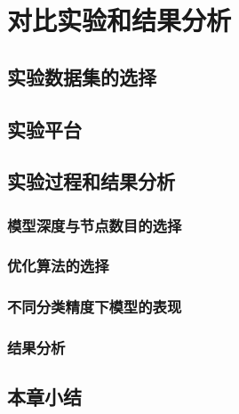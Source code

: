 
\chapter{对比实验和结果分析}

\section{实验数据集的选择}

\section{实验平台}

\section{实验过程和结果分析}

\subsection{模型深度与节点数目的选择}

\subsection{优化算法的选择}

\subsection{不同分类精度下模型的表现}

\subsection{结果分析}

\section{本章小结}